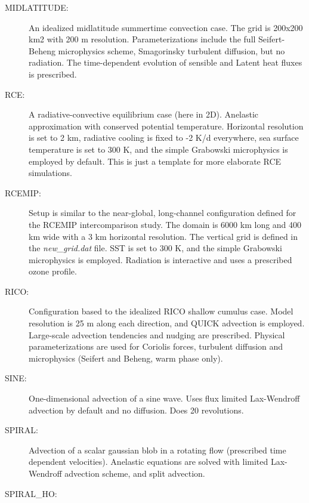 \documentclass[12pt,A4,french]{article}
\begin{document}
\begin{description}
\item[MIDLATITUDE:]

An idealized midlatitude summertime convection case. The grid is 200x200 km2 with 200 m resolution. Parameterizations include the full Seifert-Beheng microphysics scheme, Smagorinsky turbulent diffusion, but no radiation. The time-dependent evolution of sensible and Latent heat fluxes is prescribed.

\item[RCE:]

A radiative-convective equilibrium case (here in 2D). Anelastic approximation with conserved potential temperature. Horizontal resolution is set to 2 km, radiative cooling is fixed to -2 K/d everywhere, sea surface temperature is set to 300 K, and the simple Grabowski microphysics is employed by default. This is just a template for more elaborate RCE simulations.

\item[RCEMIP:]

Setup is similar to the near-global, long-channel configuration defined for the RCEMIP intercomparison study. The domain is 6000 km long and 400 km wide with a 3 km horizontal resolution. The vertical grid is defined in the {\it new\_grid.dat} file. SST is set to 300 K, and the simple Grabowski microphysics is employed. Radiation is interactive and uses a prescribed ozone profile.

\item[RICO:]

Configuration based to the idealized RICO shallow cumulus case. Model resolution is 25 m along each direction, and QUICK advection is employed. Large-scale advection tendencies and nudging are prescribed. Physical parameterizations are used for Coriolis forces, turbulent diffusion and microphysics (Seifert and Beheng, warm phase only).

\item[SINE:]

One-dimensional advection of a sine wave. Uses flux limited Lax-Wendroff advection by default and no diffusion. Does 20 revolutions.

\item[SPIRAL:]

Advection of a scalar gaussian blob in a rotating flow (prescribed time dependent velocities). Anelastic equations are solved with limited Lax-Wendroff advection scheme, and split advection.
  
\item[SPIRAL\_HO:]


\end{description}
\end{document}
